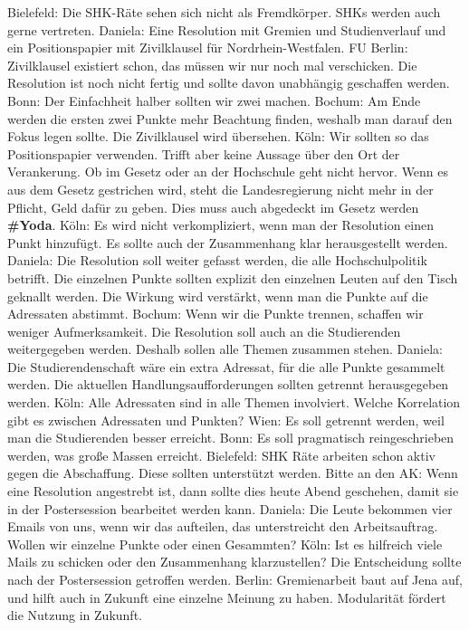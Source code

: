 \begin{outline}
          \2 Bielefeld: Die SHK-Räte sehen sich nicht als Fremdkörper. SHKs werden auch gerne vertreten.
        \1 Daniela: Eine Resolution mit Gremien und Studienverlauf und ein Positionspapier mit Zivilklausel für Nordrhein-Westfalen.
          \2 FU Berlin: Zivilklausel existiert schon, das müssen wir nur noch mal verschicken. Die Resolution ist noch nicht fertig und sollte davon unabhängig geschaffen werden.
          \2 Bonn: Der Einfachheit halber sollten wir zwei machen.
        \1 Bochum: Am Ende werden die ersten zwei Punkte mehr Beachtung finden, weshalb man darauf den Fokus legen sollte. Die Zivilklausel wird übersehen.
          \2 Köln: Wir sollten so das Positionspapier verwenden. Trifft aber keine Aussage über den Ort der Verankerung. Ob im Gesetz oder an der Hochschule geht nicht hervor. Wenn es aus dem Gesetz gestrichen wird, steht die Landesregierung nicht mehr in der Pflicht, Geld dafür zu geben. Dies muss auch abgedeckt im Gesetz werden \textbf{\#Yoda}.
          \2 Köln: Es wird nicht verkompliziert, wenn man der Resolution einen Punkt hinzufügt. Es sollte auch der Zusammenhang klar herausgestellt werden.
          \2 Daniela: Die Resolution soll weiter gefasst werden, die alle Hochschulpolitik betrifft.
          \2 Die einzelnen Punkte sollten explizit den einzelnen Leuten auf den Tisch geknallt werden.
          \2 Die Wirkung wird verstärkt, wenn man die Punkte auf die Adressaten abstimmt.
        \1 Bochum: Wenn wir die Punkte trennen, schaffen wir weniger Aufmerksamkeit. Die Resolution soll auch an die Studierenden weitergegeben werden. Deshalb sollen alle Themen zusammen stehen.
          \2 Daniela: Die Studierendenschaft wäre ein extra Adressat, für die alle Punkte gesammelt werden. Die aktuellen Handlungsaufforderungen sollten getrennt herausgegeben werden.
          \2 Köln: Alle Adressaten sind in alle Themen involviert. Welche Korrelation gibt es zwischen Adressaten und Punkten?
          \2 Wien: Es soll getrennt werden, weil man die Studierenden besser erreicht.
          \2 Bonn: Es soll pragmatisch reingeschrieben werden, was große Massen erreicht.
        \1 Bielefeld: SHK Räte arbeiten schon aktiv gegen die Abschaffung. Diese sollten unterstützt werden.
        \1 Bitte an den AK: Wenn eine Resolution angestrebt ist, dann sollte dies heute Abend geschehen, damit sie in der Postersession bearbeitet werden kann.
        \1 Daniela: Die Leute bekommen vier Emails von uns, wenn wir das aufteilen, das unterstreicht den Arbeitsauftrag. Wollen wir einzelne Punkte oder einen Gesammten?
        \2 Köln: Ist es hilfreich viele Mails zu schicken oder den Zusammenhang klarzustellen? Die Entscheidung sollte nach der Postersession getroffen werden.
        \2 Berlin: Gremienarbeit baut auf Jena auf, und hilft auch in Zukunft eine einzelne Meinung zu haben. Modularität fördert die Nutzung in Zukunft.
      \end{outline}

